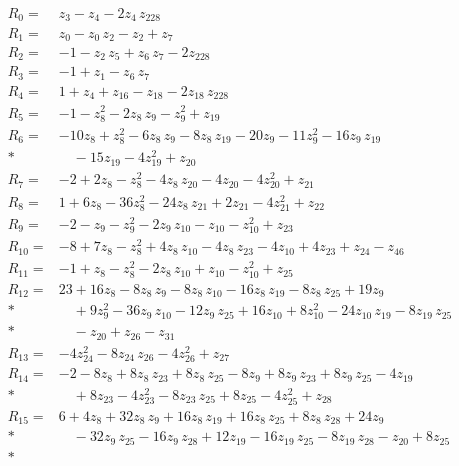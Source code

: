 \begingroup
\small
\setlength{\jot}{3pt}
\allowdisplaybreaks[4]
\begin{align*}
R_{0}={}& z_{3} - z_{4} - 2z_{4}\,z_{228} \\[2pt]
R_{1}={}& z_{0} - z_{0}\,z_{2} - z_{2} + z_{7} \\[2pt]
R_{2}={}& -1 - z_{2}\,z_{5} + z_{6}\,z_{7} - 2z_{228} \\[2pt]
R_{3}={}& -1 + z_{1} - z_{6}\,z_{7} \\[2pt]
R_{4}={}& 1 + z_{4} + z_{16} - z_{18} - 2z_{18}\,z_{228} \\[2pt]
R_{5}={}& -1 - z_{8}^{2} - 2z_{8}\,z_{9} - z_{9}^{2} + z_{19} \\[2pt]
R_{6}={}& -10z_{8} + z_{8}^{2} - 6z_{8}\,z_{9} - 8z_{8}\,z_{19} - 20z_{9} - 11z_{9}^{2} - 16z_{9}\,z_{19} \\*
&\quad  - 15z_{19} - 4z_{19}^{2} + z_{20} \\[2pt]
R_{7}={}& -2 + 2z_{8} - z_{8}^{2} - 4z_{8}\,z_{20} - 4z_{20} - 4z_{20}^{2} + z_{21} \\[2pt]
R_{8}={}& 1 + 6z_{8} - 36z_{8}^{2} - 24z_{8}\,z_{21} + 2z_{21} - 4z_{21}^{2} + z_{22} \\[2pt]
R_{9}={}& -2 - z_{9} - z_{9}^{2} - 2z_{9}\,z_{10} - z_{10} - z_{10}^{2} + z_{23} \\[2pt]
R_{10}={}& -8 + 7z_{8} - z_{8}^{2} + 4z_{8}\,z_{10} - 4z_{8}\,z_{23} - 4z_{10} + 4z_{23} + z_{24} - z_{46} \\[2pt]
R_{11}={}& -1 + z_{8} - z_{8}^{2} - 2z_{8}\,z_{10} + z_{10} - z_{10}^{2} + z_{25} \\[2pt]
R_{12}={}& 23 + 16z_{8} - 8z_{8}\,z_{9} - 8z_{8}\,z_{10} - 16z_{8}\,z_{19} - 8z_{8}\,z_{25} + 19z_{9} \\*
&\quad  + 9z_{9}^{2} - 36z_{9}\,z_{10} - 12z_{9}\,z_{25} + 16z_{10} + 8z_{10}^{2} - 24z_{10}\,z_{19} - 8z_{19}\,z_{25} \\*
&\quad  - z_{20} + z_{26} - z_{31} \\[2pt]
R_{13}={}& -4z_{24}^{2} - 8z_{24}\,z_{26} - 4z_{26}^{2} + z_{27} \\[2pt]
R_{14}={}& -2 - 8z_{8} + 8z_{8}\,z_{23} + 8z_{8}\,z_{25} - 8z_{9} + 8z_{9}\,z_{23} + 8z_{9}\,z_{25} - 4z_{19} \\*
&\quad  + 8z_{23} - 4z_{23}^{2} - 8z_{23}\,z_{25} + 8z_{25} - 4z_{25}^{2} + z_{28} \\[2pt]
R_{15}={}& 6 + 4z_{8} + 32z_{8}\,z_{9} + 16z_{8}\,z_{19} + 16z_{8}\,z_{25} + 8z_{8}\,z_{28} + 24z_{9} \\*
&\quad  - 32z_{9}\,z_{25} - 16z_{9}\,z_{28} + 12z_{19} - 16z_{19}\,z_{25} - 8z_{19}\,z_{28} - z_{20} + 8z_{25} \\*

\end{align*}

